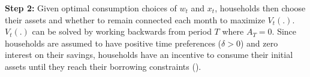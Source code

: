 \documentclass[12pt]{article}
\begin{document}
\textbf{Step 2:}  Given optimal consumption choices of $w_t$ and $x_t$, households then choose their assets and whether to remain connected each month to maximize $V_t(.)$.  $V_t(.)$ can be solved by working backwards from period $T$ where $A_T = 0$.  Since households are assumed to have positive time preferences ($\delta>0$) and zero interest on their savings, households have an incentive to consume their initial assets until they reach their borrowing constraints (\cite{deaton1991saving}).  






\end{document}
